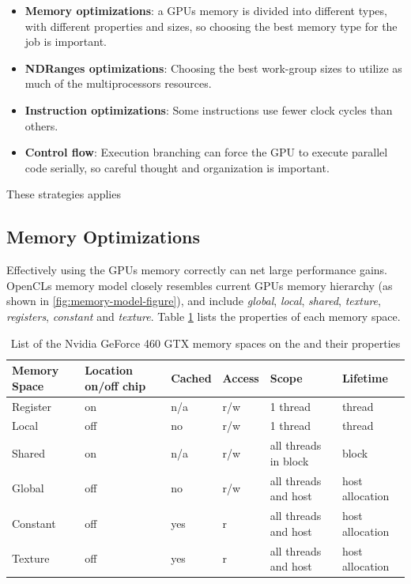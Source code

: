 \begin{itemize}

\item \textbf{Memory optimizations}: a GPUs memory is divided into different
  types, with different properties and sizes, so choosing the best
  memory type for the job is important.

\item \textbf{NDRanges optimizations}: Choosing the best work-group
  sizes to utilize as much of the multiprocessors resources.

\item \textbf{Instruction optimizations}: Some instructions use fewer
  clock cycles than others.

\item \textbf{Control flow}: Execution branching can force the GPU to
  execute parallel code serially, so careful thought and organization
  is important.

\end{itemize}

These strategies applies 

\subsection{Memory Optimizations}

Effectively using the GPUs memory correctly can net large performance
gains. OpenCLs memory model closely resembles current GPUs memory
hierarchy (as shown in \ref{fig:memory-model-figure}), and include
\textit{global}, \textit{local}, \textit{shared}, \textit{texture},
\textit{registers}, \textit{constant} and \textit{texture}. Table
\ref{table:memory-properties} lists the properties of each memory
space.

\begin{table}
  \begin{tabular}{|l|l|l|l|l|l|}
    \hline
    Memory Space & Location on/off chip & Cached & Access & Scope                & Lifetime        \\ \hline
    Register     & on                   & n/a    & r/w    & 1 thread             & thread          \\
    Local        & off                  & no     & r/w    & 1 thread             & thread          \\
    Shared       & on                   & n/a    & r/w    & all threads in block & block           \\
    Global       & off                  & no     & r/w    & all threads and host & host allocation \\
    Constant     & off                  & yes    & r      & all threads and host & host allocation \\
    Texture      & off                  & yes    & r      & all threads and host & host allocation \\
    \hline
  \end{tabular}
  \label{table:memory-properties}
  \caption{List of the Nvidia GeForce 460 GTX memory spaces on the and their properties}
\end{table}

